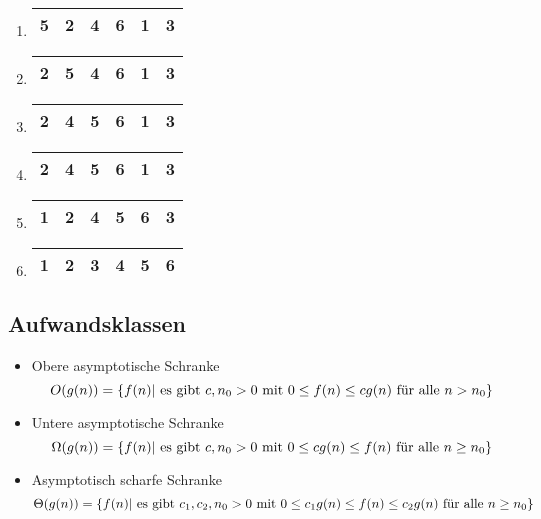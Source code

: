 \documentclass[a4paper]{scrartcl}
\begin{document}
\begin{enumerate}\renewcommand\labelenumi{(\alph{enumi})}
\item
\begin{tabular}{|r|r|r|r|r|r|}
\hline
5 & \textbf{2} & 4 & 6 & 1 & 3 \\
\hline
\end{tabular} 
\item
\begin{tabular}{|r|r|r|r|r|r|}
\hline
2 & 5 & \textbf{4} & 6 & 1 & 3 \\
\hline
\end{tabular} 
\item
\begin{tabular}{|r|r|r|r|r|r|}
\hline
2 & 4 & 5 & \textbf{6} & 1 & 3 \\
\hline
\end{tabular} 
\item
\begin{tabular}{|r|r|r|r|r|r|}
\hline
2 & 4 & 5 & 6 & \textbf{1} & 3 \\
\hline
\end{tabular} 
\item
\begin{tabular}{|r|r|r|r|r|r|}
\hline
1 & 2 & 4 & 5 & 6 & \textbf{3} \\
\hline
\end{tabular} 
\item
\begin{tabular}{|r|r|r|r|r|r|}
\hline
1 & 2 & 3 & 4 & 5 & 6 \\
\hline
\end{tabular}
\end{enumerate}


\subsection {Aufwandsklassen}
\begin{itemize}
\item Obere asymptotische Schranke
$$ O(g(n))=\{f(n)| \textnormal{ es gibt } c,n_0>0 \textnormal{ mit } 0 \leq f(n) \leq cg(n) \textnormal{ für alle } n>n_0 \} $$
\item Untere asymptotische Schranke
$$ \Omega(g(n))=\{f(n)| \textnormal{ es gibt } c,n_0>0 \textnormal{ mit } 0 \leq cg(n)\leq f(n) \textnormal{ für alle } n \geq n_0 \} $$
\item Asymptotisch scharfe Schranke
$$ \Theta(g(n))=\{f(n)| \textnormal{ es gibt } c_1,c_2,n_0>0 \textnormal{ mit } 0\leq c_1 g(n) \leq f(n) \leq c_2 g(n) \textnormal{ für alle } n \geq n_0\} $$ 
\end{itemize}
\end{document}
